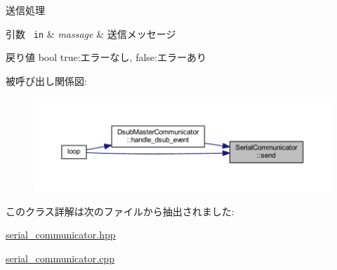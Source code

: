送信処理 


\begin{DoxyParams}[1]{引数}
\mbox{\texttt{ in}}  & {\em massage} & 送信メッセージ \\
\hline
\end{DoxyParams}
\begin{DoxyReturn}{戻り値}
bool true\+:エラーなし, false\+:エラーあり 
\end{DoxyReturn}
被呼び出し関係図\+:\nopagebreak
\begin{figure}[H]
\begin{center}
\leavevmode
\includegraphics[width=350pt]{class_serial_communicator_add5f2442d225ecc542f4b8c58a970281_icgraph}
\end{center}
\end{figure}


このクラス詳解は次のファイルから抽出されました\+:\begin{DoxyCompactItemize}
\item 
\mbox{\hyperlink{serial__communicator_8hpp}{serial\+\_\+communicator.\+hpp}}\item 
\mbox{\hyperlink{serial__communicator_8cpp}{serial\+\_\+communicator.\+cpp}}\end{DoxyCompactItemize}
